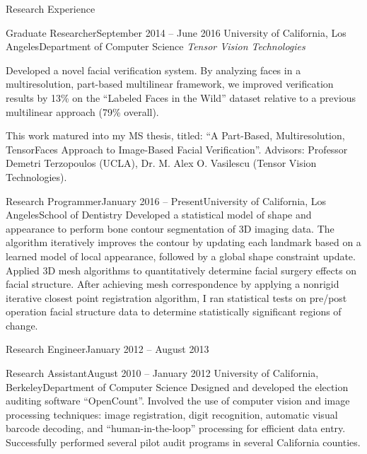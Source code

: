\documentclass{resume}
\begin{document}
\vspace{0.5em}

\begin{component}{Research Experience}
    \begin{position}{Graduate Researcher}{September 2014 -- June 2016}
        {University of California, Los Angeles}{Department of Computer Science}
    \emph{Tensor Vision Technologies}

    {Developed a novel facial verification system. 
By analyzing faces in a multiresolution, part-based multilinear framework, we improved verification results by 13\% on the ``Labeled Faces in the Wild'' dataset relative to a previous multilinear approach (79\% overall).

This work matured into my MS thesis, titled: ``A Part-Based, Multiresolution, TensorFaces Approach to Image-Based Facial Verification''.
Advisors: Professor Demetri Terzopoulos (UCLA), Dr. M. Alex O. Vasilescu (Tensor Vision Technologies).
}
    \end{position}

    \begin{position}{Research Programmer}{January 2016 -- Present}{University of California, Los Angeles}{School of Dentistry}
      {
Developed a statistical model of shape and appearance to perform bone contour segmentation of 3D imaging data.
The algorithm iteratively improves the contour by updating each landmark based on a learned model of local appearance, followed by a global shape constraint update.
\\
Applied 3D mesh algorithms to quantitatively determine facial surgery effects on facial structure.
After achieving mesh correspondence by applying a nonrigid iterative closest point registration algorithm, I ran statistical tests on pre/post operation facial structure data to determine statistically significant regions of change.
}
      \end{position}


    \begin{position}{Research Engineer}{January 2012 -- August 2013}
        {}{}{}
    \end{position}

\vspace{-3.25em}

    \begin{position}{Research Assistant}{August 2010 -- January 2012}
        {University of California, Berkeley}{Department of Computer Science}
    {Designed and developed the election auditing software ``OpenCount''.
Involved the use of computer vision and image processing techniques: image registration, digit recognition, automatic visual barcode decoding, and ``human-in-the-loop'' processing for efficient data entry.
Successfully performed several pilot audit programs in several California counties.}
    \end{position}
    
\end{component}
\end{document}
